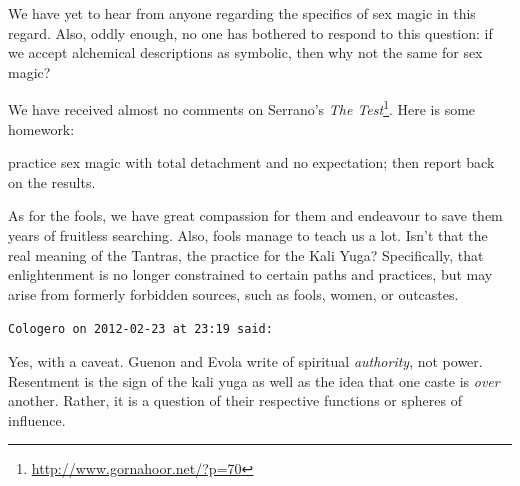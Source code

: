 \begin{footnotesize}
\begin{sffamily}
We have yet to hear from anyone regarding the specifics of sex magic in this regard. Also, oddly enough, no one has bothered to respond to this question: if we accept alchemical descriptions as symbolic, then why not the same for sex magic?

We have received almost no comments on Serrano's
\textit{The Test}\footnote{\url{http://www.gornahoor.net/?p=70}}. Here is some homework:

practice sex magic with total detachment and no expectation; then report back on the results.

As for the fools, we have great compassion for them and endeavour to save them years of fruitless searching. Also, fools manage to teach us a lot. Isn't that the real meaning of the Tantras, the practice for the Kali Yuga? Specifically, that enlightenment is no longer constrained to certain paths and practices, but may arise from formerly forbidden sources, such as fools, women, or outcastes.

\hfill

\texttt{Cologero on 2012-02-23 at 23:19 said:}

Yes, with a caveat. Guenon and Evola write of spiritual
\emph{authority}, not power. Resentment is the sign of the kali yuga as well as the idea that one caste is \emph{over} another. Rather, it is a question of their respective functions or spheres of influence.

\hfill


\end{sffamily}
\end{footnotesize}

